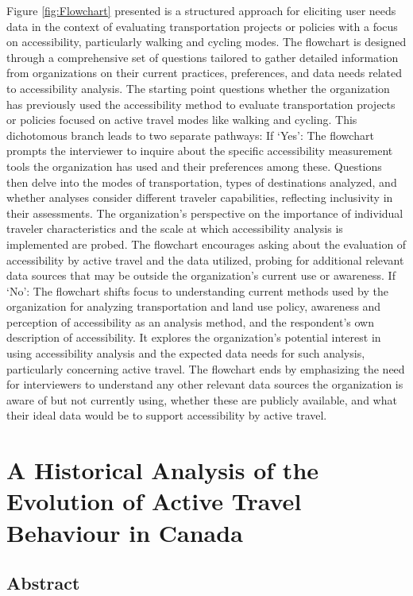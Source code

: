 \documentclass[
11pt, %
oneside, %
english, %
singlespacing, %
]{macthesis} %
\begin{document}
Figure \ref{fig:Flowchart} presented is a structured approach for eliciting user needs data in the context of evaluating transportation projects or policies with a focus on accessibility, particularly walking and cycling modes. The flowchart is designed through a comprehensive set of questions tailored to gather detailed information from organizations on their current practices, preferences, and data needs related to accessibility analysis. The starting point questions whether the organization has previously used the accessibility method to evaluate transportation projects or policies focused on active travel modes like walking and cycling. This dichotomous branch leads to two separate pathways:
If `Yes':
The flowchart prompts the interviewer to inquire about the specific accessibility measurement tools the organization has used and their preferences among these.
Questions then delve into the modes of transportation, types of destinations analyzed, and whether analyses consider different traveler capabilities, reflecting inclusivity in their assessments.
The organization's perspective on the importance of individual traveler characteristics and the scale at which accessibility analysis is implemented are probed.
The flowchart encourages asking about the evaluation of accessibility by active travel and the data utilized, probing for additional relevant data sources that may be outside the organization's current use or awareness.
If `No':
The flowchart shifts focus to understanding current methods used by the organization for analyzing transportation and land use policy, awareness and perception of accessibility as an analysis method, and the respondent's own description of accessibility.
It explores the organization's potential interest in using accessibility analysis and the expected data needs for such analysis, particularly concerning active travel.
The flowchart ends by emphasizing the need for interviewers to understand any other relevant data sources the organization is aware of but not currently using, whether these are publicly available, and what their ideal data would be to support accessibility by active travel.

\hypertarget{math-sci}{%
\chapter{A Historical Analysis of the Evolution of Active Travel Behaviour in Canada}\label{math-sci}}

\hypertarget{abstract-1}{%
\section{Abstract}\label{abstract-1}}
\end{document}
